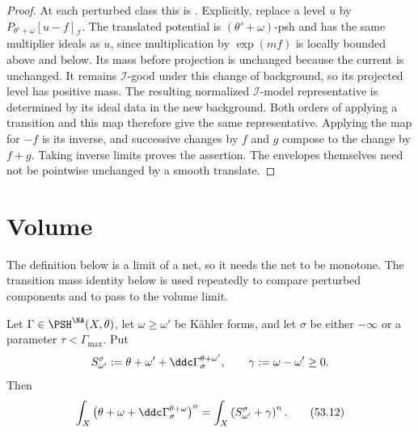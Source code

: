 \begin{proof}
At each perturbed class this is \cite[Proposition~9.3.2]{XiaBook}.
Explicitly, replace a level $u$ by
$P_{\theta'+\omega}[u-f]_{\mathcal I}$.
The translated potential is $(\theta'+\omega)$-psh and has the same
multiplier ideals as $u$, since multiplication by $\exp(mf)$ is locally
bounded above and below.  Its mass before projection is unchanged
because the current is unchanged.  It remains $\mathcal I$-good under
this change of background, so its projected level has positive mass.
The resulting normalized $\mathcal I$-model representative is determined
by its ideal data in the new background.  Both orders of applying a
transition and this map therefore give the same representative.
Applying the map for $-f$ is its inverse, and successive changes by
$f$ and $g$ compose to the change by $f+g$.  Taking inverse limits
proves the assertion.  The envelopes themselves need not be pointwise
unchanged by a smooth translate.
\end{proof}

\section{Volume}
\label{sec:tna-volume}

The definition below is a limit of a net, so it needs the net to be
monotone.  The transition mass identity below is used repeatedly to compare
perturbed components and to pass to the volume limit.

\par\noindent\begin{minipage}{\textwidth}
\begin{lemma}
\label{lem:tna-transition-mass-identity}
Let $\Gamma\in\PSH^{\NA}(X,\theta)$, let $\omega\geq\omega'$ be
K\"ahler forms, and let $\sigma$ be either $-\infty$ or a parameter
$\tau<\Gamma_{\max}$.  Put
\[
 S^\sigma_{\omega'}
 :=\theta+\omega'+\ddc\Gamma_\sigma^{\theta+\omega'},
 \qquad
 \gamma:=\omega-\omega'\geq0 .
\]
Then
\[
 \int_X\left(\theta+\omega+
       \ddc\Gamma_\sigma^{\theta+\omega}\right)^n
 =\int_X\left(S^\sigma_{\omega'}+\gamma\right)^n .
\tag{53.12}\label{eq:tna-transition-mass-identity}
\]
\end{lemma}
\end{minipage}\par\medskip

